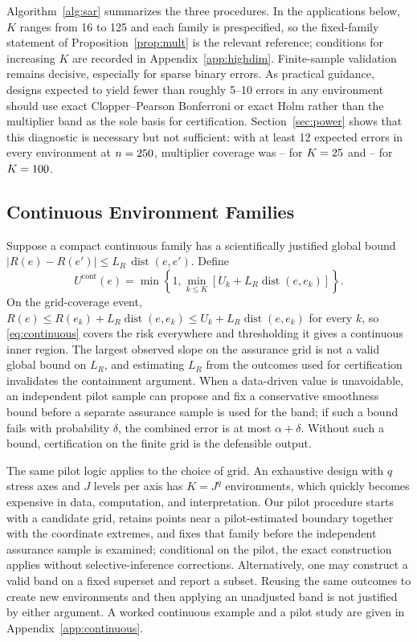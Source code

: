\documentclass[twoside,11pt]{article}
\newcommand{\dist}{\operatorname{dist}}
\begin{document}
Algorithm~\ref{alg:sar} summarizes the three procedures. In the applications below, $K$
ranges from 16 to 125 and each family is prespecified, so the fixed-family statement of
Proposition~\ref{prop:mult} is the relevant reference; conditions for increasing $K$ are
recorded in Appendix~\ref{app:highdim}. Finite-sample validation remains decisive, especially
for sparse binary errors. As practical guidance, designs expected to yield fewer than roughly
5--10 errors in any environment should use exact Clopper--Pearson Bonferroni or exact Holm
rather than the multiplier band as the sole basis for certification. Section~\ref{sec:power}
shows that this diagnostic is necessary but not sufficient: with at least 12 expected errors
in every environment at $n=250$, multiplier coverage was
\PowerMultCovSmallKLo--\PowerMultCovSmallKHi{} for $K=25$ and
\PowerMultCovLargeKLo--\PowerMultCovLargeKHi{} for $K=100$.

\subsection{Continuous Environment Families}
\label{sec:design}
Suppose a compact continuous family has a scientifically justified global bound
$|R(e)-R(e')|\leq L_R\,\dist(e,e')$. Define
\begin{equation}
U^{\mathrm{cont}}(e)=\min\left\{1,\min_{k\leq K}[U_k+L_R\dist(e,e_k)]\right\}.
\label{eq:continuous}
\end{equation}
On the grid-coverage event, $R(e)\leq R(e_k)+L_R\dist(e,e_k)\leq U_k+L_R\dist(e,e_k)$ for
every $k$, so \eqref{eq:continuous} covers the risk everywhere and thresholding it gives a
continuous inner region. The largest observed slope on the assurance grid is not a valid
global bound on $L_R$, and estimating $L_R$ from the outcomes used for certification
invalidates the containment argument. When a data-driven value is unavoidable, an independent
pilot sample can propose and fix a conservative smoothness bound before a separate assurance
sample is used for the band; if such a bound fails with probability $\delta$, the combined
error is at most $\alpha+\delta$. Without such a bound, certification on the finite grid is
the defensible output.

The same pilot logic applies to the choice of grid. An exhaustive design with $q$ stress axes
and $J$ levels per axis has $K=J^q$ environments, which quickly becomes expensive in data,
computation, and interpretation. Our pilot procedure starts with a candidate grid, retains
points near a pilot-estimated boundary together with the coordinate extremes, and fixes that
family before the independent assurance sample is examined; conditional on the pilot, the
exact construction applies without selective-inference corrections. Alternatively, one may
construct a valid band on a fixed superset and report a subset. Reusing the same outcomes to
create new environments and then applying an unadjusted band is not justified by either
argument. A worked continuous example and a pilot study are given in
Appendix~\ref{app:continuous}.
\end{document}
